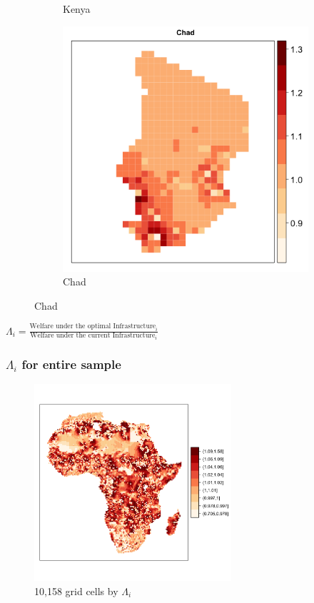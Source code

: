 \documentclass[]{beamer}   	%
\begin{document}
\begin{frame}
\begin{figure}
\begin{subfigure}[c]{0.32\textwidth}
\caption{Kenya}
\label{fig:Kenya_zeta}
\end{subfigure}
\begin{subfigure}[c]{0.32\textwidth}
\includegraphics[width=\textwidth]{../../Analysis/output/zeta_heatmaps/Chad_zeta.png}
\caption{Chad}
\label{fig:Chad_zeta}
\end{subfigure}
\end{figure}
\centering
$\Lambda_{i} = \frac{\textrm{Welfare under the optimal Infrastructure}_{i}}{\textrm{Welfare under the current Infrastructure}_{i}}$
\end{frame}

\begin{frame}
  \frametitle{$\Lambda_{i}$ for entire sample}
    \label{Grid_Cell_Map}
  \begin{figure}
    \includegraphics[width=0.65\textwidth, trim={1cm 4cm 0cm 2cm},clip]{../../Analysis/output/zeta_heatmaps/African_gridcells_zeta.png}
    \caption{10,158 grid cells by $\Lambda_{i}$}
  \end{figure}
\end{frame}
\end{document}
